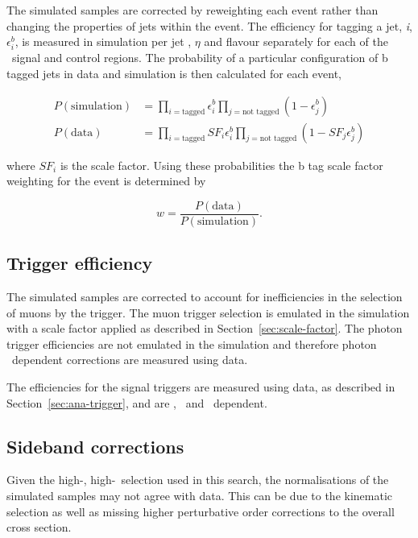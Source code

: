 The simulated samples are corrected by reweighting
each event rather than changing the properties of jets within the event. 
The efficiency for tagging a jet, \textit{i}, $\epsilon_{i}^{b}$, is measured in simulation per 
jet \pt, $\eta$ and flavour separately for each of the 
\alphat~signal and control regions. The probability of a particular configuration 
of b tagged jets in data and simulation is then calculated for each event,

\begin{align}
P(\text{simulation}) &= \prod_{i=\text{tagged}} \epsilon^{b}_{i} \prod_{j=\text{not tagged}} (1-\epsilon^{b}_{j})\\
P(\text{data}) &= \prod_{i=\text{tagged}} SF_{i}\epsilon^{b}_{i} \prod_{j=\text{not tagged}} (1-SF_{j}\epsilon^{b}_{j})
\end{align}

where $SF_{i}$ is the scale factor. Using these probabilities the b tag scale factor 
weighting for the event is determined by

\begin{equation}
w = \frac{P(\text{data})}{P(\text{simulation})}.
\end{equation}

\subsection{Trigger efficiency}

The simulated samples are corrected to account for inefficiencies in the selection of muons
by the trigger. The muon trigger selection is emulated in the simulation with a scale factor
applied as described in Section~\ref{sec:scale-factor}. The photon trigger efficiencies
are not emulated in the simulation and therefore photon \pt~dependent corrections are measured 
using data. 

The efficiencies for the signal triggers are measured using data, as described 
in Section~\ref{sec:ana-trigger}, and are \scalht, \njet~and \mht~dependent.

\subsection{Sideband corrections}
\label{sec:sideband-corrections}

Given the high-\scalht, high-\etmiss~selection used in this search, 
the normalisations of the simulated samples may not agree with data. 
This can be due to the kinematic selection as well as missing higher 
perturbative order corrections to the overall cross section. 

